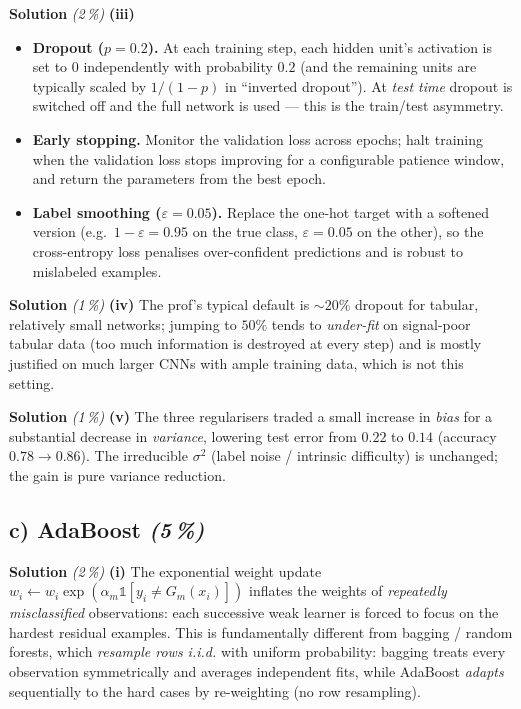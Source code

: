 \documentclass[11pt,a4paper]{article}
\newcommand{\subpoints}[1]{\textit{(#1\,\%)}}
\newcommand{\sol}{\noindent\textbf{Solution}}
\begin{document}
\medskip
\sol{} \subpoints{2} \textbf{(iii)}
\begin{itemize}
  \item \textbf{Dropout ($p=0.2$).} At each training step, each hidden unit's activation is set
        to $0$ independently with probability $0.2$ (and the remaining units are typically scaled
        by $1/(1-p)$ in ``inverted dropout''). At \emph{test time} dropout is switched off and the
        full network is used --- this is the train/test asymmetry.
  \item \textbf{Early stopping.} Monitor the validation loss across epochs; halt training when the
        validation loss stops improving for a configurable patience window, and return the
        parameters from the best epoch.
  \item \textbf{Label smoothing ($\varepsilon=0.05$).} Replace the one-hot target with a softened
        version (e.g.\ $1-\varepsilon = 0.95$ on the true class, $\varepsilon = 0.05$ on the other),
        so the cross-entropy loss penalises over-confident predictions and is robust to mislabeled
        examples.
\end{itemize}

\medskip
\sol{} \subpoints{1} \textbf{(iv)} The prof's typical default is $\sim 20\%$ dropout for tabular,
relatively small networks; jumping to $50\%$ tends to \emph{under-fit} on signal-poor tabular data
(too much information is destroyed at every step) and is mostly justified on much larger CNNs with
ample training data, which is not this setting.

\medskip
\sol{} \subpoints{1} \textbf{(v)} The three regularisers traded a small increase in \emph{bias} for
a substantial decrease in \emph{variance}, lowering test error from $0.22$ to $0.14$
(accuracy $0.78\to 0.86$). The irreducible $\sigma^2$ (label noise / intrinsic difficulty) is
unchanged; the gain is pure variance reduction.

\subsection*{c) AdaBoost \subpoints{5}}

\sol{} \subpoints{2} \textbf{(i)} The exponential weight update $w_i \leftarrow w_i\exp(\alpha_m
\mathbb{1}[y_i\neq G_m(x_i)])$ inflates the weights of \emph{repeatedly misclassified}
observations: each successive weak learner is forced to focus on the hardest residual examples.
This is fundamentally different from bagging / random forests, which \emph{resample rows i.i.d.}
with uniform probability: bagging treats every observation symmetrically and averages independent
fits, while AdaBoost \emph{adapts} sequentially to the hard cases by re-weighting (no row
resampling).
\end{document}
